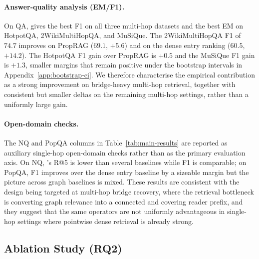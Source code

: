 \paragraph{Answer-quality analysis (EM/F1).}
On QA, \methodname{} gives the best F1 on all three multi-hop
datasets and the best EM on HotpotQA, 2WikiMultiHopQA, and
MuSiQue. The 2WikiMultiHopQA F1 of $74.7$ improves on PropRAG
($69.1$, $+5.6$) and on the dense entry ranking ($60.5$,
$+14.2$). The HotpotQA F1 gain over PropRAG is $+0.5$ and the
MuSiQue F1 gain is $+1.3$, smaller margins that remain positive
under the bootstrap intervals in
Appendix~\ref{app:bootstrap-ci}. We therefore characterise the
empirical contribution as a strong improvement on bridge-heavy
multi-hop retrieval, together with consistent but smaller deltas
on the remaining multi-hop settings, rather than a uniformly
large gain.

\paragraph{Open-domain checks.}
The NQ and PopQA columns in Table~\ref{tab:main-results} are
reported as auxiliary single-hop open-domain checks rather than as
the primary evaluation axis. On NQ, \methodname{}'s R@5 is lower
than several baselines while F1 is comparable; on PopQA, F1
improves over the dense entry baseline by a sizeable margin but
the picture across graph baselines is mixed. These results are
consistent with the design being targeted at multi-hop bridge
recovery, where the retrieval bottleneck is converting graph
relevance into a connected and covering reader prefix, and they
suggest that the same operators are not uniformly advantageous in
single-hop settings where pointwise dense retrieval is already
strong.

\subsection{Ablation Study (RQ2)}
\label{sec:experiments:ablation}

